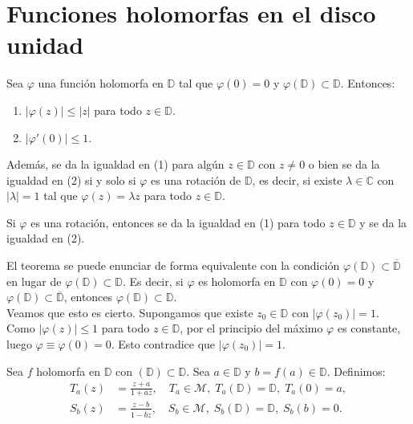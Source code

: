 \section{Funciones holomorfas en el disco unidad}
\begin{theorem}
    Sea $\varphi$ una función holomorfa en $\mathbb{D}$ tal que $\varphi(0) = 0$ y $\varphi(\mathbb{D}) \subset \mathbb{D}$.
    Entonces:
    \begin{enumerate}
        \item $|\varphi(z)| \leq |z|$ para todo $z \in \mathbb{D}$.
        \item $|\varphi'(0)| \leq 1$.
    \end{enumerate}

    Además, se da la igualdad en (1) para algún $z \in \mathbb{D}$ con $z \neq 0$ o bien se da la igualdad en (2) si y solo si $\varphi$ es una rotación de $\mathbb{D}$, es decir, si existe $\lambda \in \mathbb{C}$ con $|\lambda| = 1$ tal que $\varphi(z) = \lambda z$ para todo $z \in \mathbb{D}$.
\end{theorem}

\begin{remark}
    Si $\varphi$ es una rotación, entonces se da la igualdad en (1) para todo $z \in \mathbb{D}$ y se da la igualdad en (2).
\end{remark}

\begin{remark}
    El teorema se puede enunciar de forma equivalente con la condición $\varphi(\mathbb{D}) \subset \overline{\mathbb{D}}$ en lugar de $\varphi(\mathbb{D}) \subset \mathbb{D}$.
    Es decir, si $\varphi$ es holomorfa en $\mathbb{D}$ con $\varphi(0) = 0$ y $\varphi(\mathbb{D}) \subset \overline{\mathbb{D}}$, entonces $\varphi(\mathbb{D}) \subset \mathbb{D}$. \\
    Veamos que esto es cierto.
    Supongamos que existe $z_0 \in \mathbb{D}$ con $|\varphi(z_0)| = 1$.
    Como $|\varphi(z)| \leq 1$ para todo $z \in \mathbb{D}$, por el principio del máximo $\varphi$ es constante, luego $\varphi \equiv \varphi(0) = 0$.
    Esto contradice que $|\varphi(z_0)| = 1$.
\end{remark}

Sea $f$ holomorfa en $\mathbb{D}$ con $(\mathbb{D}) \subset \mathbb{D}$.
Sea $a \in \mathbb{D}$ y $b = f(a) \in \mathbb{D}$.
Definimos:
\begin{align*}
    T_a(z) & = \frac{z+a}{1 + \overline{a}z}, \quad T_a \in \mathcal{M}, \; T_a(\mathbb{D}) = \mathbb{D}, \; T_a(0) = a, \\
    S_b(z) & = \frac{z-b}{1 - \overline{b}z}, \quad S_b \in \mathcal{M}, \; S_b(\mathbb{D}) = \mathbb{D}, \; S_b(b) = 0.
\end{align*}

